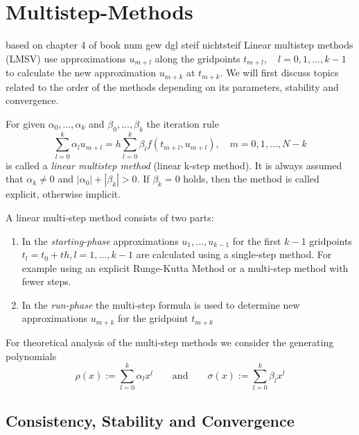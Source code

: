 			
\section{Multistep-Methods}
	based on chapter 4 of book num gew dgl steif nichtsteif \newline
	Linear multistep methods (LMSV) use approximations $u_{m+l}$ along the gridpoints $t_{m+l}, \quad l=0,1,...,k-1$ to calculate the new approximation $u_{m+k}$ at $t_{m+k}$. We will first discuss topics related to the order of the methods depending on its parameters, stability and convergence.
	
	\begin{definition}
		For given $\alpha_0, ..., \alpha_k$ and $\beta_0, ..., \beta_k$ the iteration rule
		\begin{equation}
			\label{linear-multistep-method}
			\sum_{l=0}^{k} \alpha_l u_{m+l} = h \sum_{l=0}^{k} \beta_l f(t_{m+l}, u_{m+l}), \quad m=0,1,...,N-k
		\end{equation}
		is called a \emph{linear multistep method} (linear k-step method). It is always assumed that $\alpha_k \neq 0$ and $|\alpha_0| + |\beta_k| > 0$. If $\beta_k=0$ holds, then the method is called explicit, otherwise implicit.
	\end{definition}
	
	A linear multi-step method consists of two parts:
	\begin{enumerate}
		\item In the \emph{starting-phase} approximations $u_1,...,u_{k-1}$ for the first $k-1$ gridpoints $t_l = t_0+th, l=1,...,k-1$ are calculated using a single-step method. For example using an explicit Runge-Kutta Method or a multi-step method with fewer steps.
		
		\item  In the \emph{run-phase} the multi-step formula is used to determine new approximations $u_{m+k}$ for the gridpoint $t_{m+k}$
	\end{enumerate}
	
	For theoretical analysis of the multi-step methods we consider the generating polynomials
	\begin{equation}
		\label{eq:generating polynomials multistep method}
		\rho(x) := \sum_{l=0}^{k} \alpha_l x^l
		\qquad \text{and} \qquad
		\sigma(x) := \sum_{l=0}^{k} \beta_l x^l
	\end{equation}
			
	
	\subsection{Consistency, Stability and Convergence}
	\cite{NumerikGewöhnlicherDifferentialgleichungen}
	
